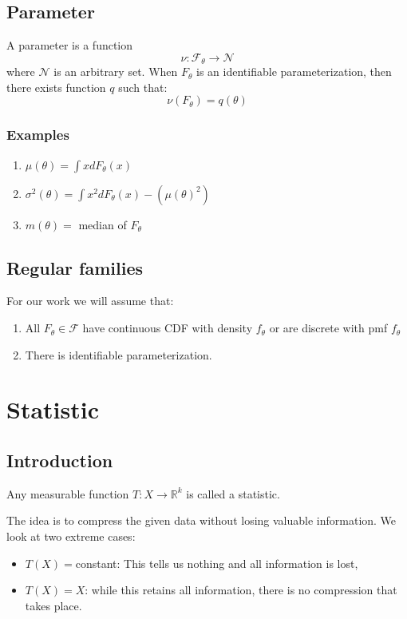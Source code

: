 \documentclass[oneside]{book}
\begin{document}
\section{Parameter}
A parameter is a function $$\nu:\mathcal{F}_\theta\to\mathcal N$$
where $\mathcal N$ is an arbitrary set. When $F_\theta$ is an identifiable parameterization, then there exists function $q$ such that:
$$\nu(F_\theta)=q(\theta)$$
\subsection{Examples}
\begin{enumerate}
    \item $\mu(\theta)=\int xdF_\theta(x)$
    \item $\sigma^2(\theta)=\int x^2dF_\theta(x)-(\mu(\theta)^2)$
    \item $m(\theta)=$ median of $F_\theta$
\end{enumerate}

\section{Regular families}
For our work we will assume that:
\begin{enumerate}
    \item All $F_\theta\in\mathcal F$ have continuous CDF with density $f_\theta$ or are discrete with pmf $f_\theta$
    \item There is identifiable parameterization. 
\end{enumerate}


\chapter{Statistic}
\section{Introduction}
Any measurable function $T:X\to \mathbb R^k$ is called a statistic. 

The idea is to compress the given data without losing valuable information. We look at two extreme cases:
\begin{itemize}
    \item $T(X)=$constant: This tells us nothing and all information is lost,
    \item $T(X)=X$: while this retains all information, there is no compression that takes place. 
\end{itemize}
\end{document}
